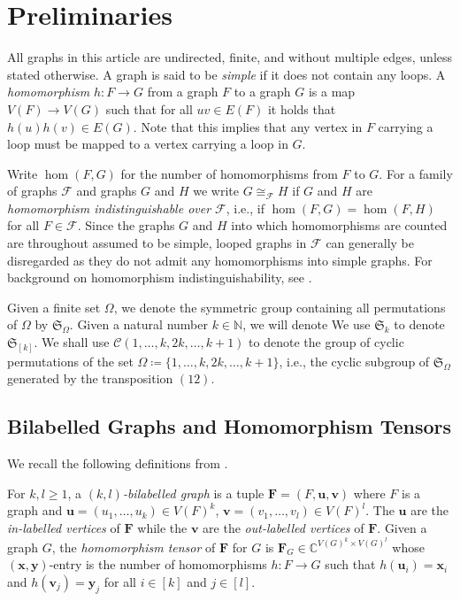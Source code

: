 \documentclass[11pt,a4paper]{article}
\theoremstyle{plain}
\theoremstyle{remark}
\theoremstyle{definition}
\newcommand{\cyclicpermutations}{\mathscr{C}(1,\dots, k, 2k, \dots, k+1)}
\begin{document}
\section{Preliminaries}\label{sec:preliminaries}

All graphs in this article are undirected, finite, and without multiple edges, unless stated otherwise. A graph is said to be \emph{simple} if it does not contain any loops. 
A \emph{homomorphism} $h \colon F \to G$ from a graph $F$ to a graph $G$ is a map $V(F) \to V(G)$ such that for all $uv \in E(F)$ it holds that $h(u)h(v) \in E(G)$. Note that this implies that any vertex in $F$ carrying a loop must be mapped to a vertex carrying a loop in $G$.

Write $\hom(F, G)$ for the number of homomorphisms from $F$ to $G$. For a family of graphs $\mathcal{F}$ and graphs $G$ and $H$ we write $G \cong_{\mathcal{F}} H$ if $G$ and $H$ are \emph{homomorphism indistinguishable over $\mathcal{F}$}, i.e., if $\hom(F, G) = \hom(F, H)$ for all $F \in \mathcal{F}$.
Since the graphs $G$ and $H$ into which homomorphisms are counted are throughout assumed to be simple, looped graphs in $\mathcal{F}$ can generally be disregarded as they do not admit any homomorphisms into simple graphs.
For background on homomorphism indistinguishability, see \cite{seppelt_homomorphism_2024}.

Given a finite set $\Omega$, we denote the symmetric group containing all permutations of $\Omega$ by $\mathfrak{S}_{\Omega}$. Given a natural number $k \in \mathbb{N}$, we will denote We use $\mathfrak{S}_{k}$ to denote $\mathfrak{S}_{[k]}$. We shall use $\cyclicpermutations$ to denote the group of cyclic permutations of the set $\Omega \coloneq \{1,\dots,k, 2k, \dots, k+1\}$, i.e., the cyclic subgroup of $\mathfrak{S}_{\Omega}$ generated by the transposition $(12)$. 

\subsection{Bilabelled Graphs and Homomorphism Tensors}\label{sec:hom-ten}

We recall the following definitions from \cite{david-laura,grohe_homomorphism_2022}.
    
For $k, l \geq 1$, a \emph{$(k, l)$-bilabelled graph} is a tuple $\boldsymbol{F} = (F, \boldsymbol{u}, \boldsymbol{v})$ where $F$ is a graph and $\boldsymbol{u} = (u_1, \dots , u_k) \in V(F)^k$, $\boldsymbol{v} = (v_1, \dots, v_l) \in V(F)^l$.
The $\boldsymbol{u}$ are the \emph{in-labelled vertices} of $\boldsymbol{F}$ while the $\boldsymbol{v}$ are the \emph{out-labelled vertices} of $\boldsymbol{F}$. Given a graph $G$, the \emph{homomorphism tensor} of $\boldsymbol{F}$ for $G$ is $\boldsymbol{F}_G \in \mathbb{C}^{V(G)^k \times V(G)^l}$ whose $(\boldsymbol{x}, \boldsymbol{y})$-entry is the number of homomorphisms $h \colon F \to G$ such that $h(\boldsymbol{u}_i) = \boldsymbol{x}_i$ and $h(\boldsymbol{v}_j) = \boldsymbol{y}_j$ for all $i \in [k]$ and $j \in [l]$. 
\end{document}

